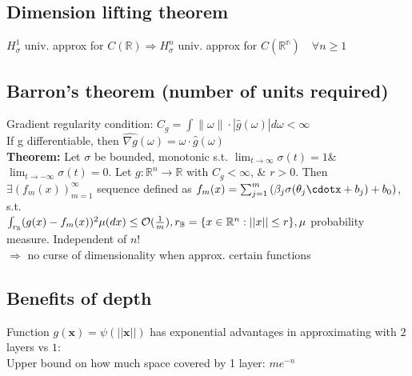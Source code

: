 \subsection*{Dimension lifting theorem}
$H^1_{\sigma}$ univ. approx for $C(\mathbb{R}) \Rightarrow H^n_{\sigma}$ univ. approx for 
$C(\mathbb{R^n})\quad\forall n\geq1$
\subsection*{Barron's theorem (number of units required)}
Gradient regularity condition: $C_g = \int \| \omega \|\cdot |\hat{g}(\omega)|d\omega < \infty$\\If g differentiable, then $\hat{\nabla g}(\omega) = \omega\cdot \hat{g}(\omega)$\\
\textbf{Theorem:} Let $\sigma$ be bounded, monotonic s.t. $\lim_{t\rightarrow\infty}\sigma(t) = 1$\& $\lim_{t\rightarrow-\infty}\sigma(t) = 0$. Let $g:\mathbb{R}^n\rightarrow\mathbb{R}$ with $C_g < \infty$, \& $r>0$. Then $\exists (f_m(x))_{m=1}^{\infty}$ sequence defined as $f_m(x) = \sum_{j=1}^m\left(\beta_j\sigma(\theta_j\cdotx + b_j) + b_0\right)$, s.t. \\$ \int_{r_{\mathbb{B}}}(g(x) - f_m(x))^2\mu(dx) \leq \mathcal{O}(\frac{1}{m}), \\ r_{\mathbb B}=\{x\in\mathbb R^n:||x||\leq r\}, \mu$ probability measure. Independent of $n$!\\
$\Rightarrow$ no curse of dimensionality when approx. certain functions
\subsection*{Benefits of depth}
Function $g(\mathbf x)=\psi(||\mathbf x||)$ has exponential advantages in approximating with $2$ layers vs $1$: \\
Upper bound on how much space covered by 1 layer: $me^{-n}$